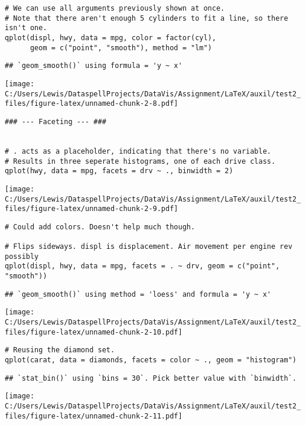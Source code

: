 \begin{verbatim}
# We can use all arguments previously shown at once.
# Note that there aren't enough 5 cylinders to fit a line, so there isn't one.
qplot(displ, hwy, data = mpg, color = factor(cyl),
      geom = c("point", "smooth"), method = "lm")
\end{verbatim}

\begin{verbatim}
## `geom_smooth()` using formula = 'y ~ x'
\end{verbatim}

\texttt{[image: C:/Users/Lewis/DataspellProjects/DataVis/Assignment/LaTeX/auxil/test2\_files/figure-latex/unnamed-chunk-2-8.pdf]}

\begin{verbatim}
### --- Faceting --- ###


# . acts as a placeholder, indicating that there's no variable.
# Results in three seperate histograms, one of each drive class.
qplot(hwy, data = mpg, facets = drv ~ ., binwidth = 2)
\end{verbatim}

\texttt{[image: C:/Users/Lewis/DataspellProjects/DataVis/Assignment/LaTeX/auxil/test2\_files/figure-latex/unnamed-chunk-2-9.pdf]}

\begin{verbatim}
# Could add colors. Doesn't help much though.

# Flips sideways. displ is displacement. Air movement per engine rev possibly
qplot(displ, hwy, data = mpg, facets = . ~ drv, geom = c("point", "smooth"))
\end{verbatim}

\begin{verbatim}
## `geom_smooth()` using method = 'loess' and formula = 'y ~ x'
\end{verbatim}

\texttt{[image: C:/Users/Lewis/DataspellProjects/DataVis/Assignment/LaTeX/auxil/test2\_files/figure-latex/unnamed-chunk-2-10.pdf]}

\begin{verbatim}
# Reusing the diamond set.
qplot(carat, data = diamonds, facets = color ~ ., geom = "histogram")
\end{verbatim}

\begin{verbatim}
## `stat_bin()` using `bins = 30`. Pick better value with `binwidth`.
\end{verbatim}

\texttt{[image: C:/Users/Lewis/DataspellProjects/DataVis/Assignment/LaTeX/auxil/test2\_files/figure-latex/unnamed-chunk-2-11.pdf]}

